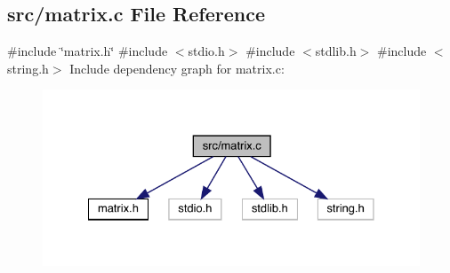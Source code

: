 \subsection{src/matrix.c File Reference}
\label{matrix_8c}
{\ttfamily \#include \char`\"{}matrix.\+h\char`\"{}}\newline
{\ttfamily \#include $<$stdio.\+h$>$}\newline
{\ttfamily \#include $<$stdlib.\+h$>$}\newline
{\ttfamily \#include $<$string.\+h$>$}\newline
Include dependency graph for matrix.\+c\+:\nopagebreak
\begin{figure}[H]
\begin{center}
\leavevmode
\includegraphics[width=328pt]{matrix_8c__incl}
\end{center}
\end{figure}
